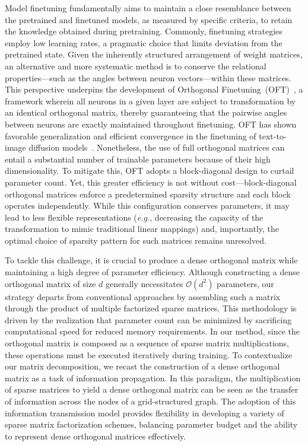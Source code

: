 Model finetuning fundamentally aims to maintain a close resemblance between the pretrained and finetuned models, as measured by specific criteria, to retain the knowledge obtained during pretraining. Commonly, finetuning strategies employ low learning rates, a pragmatic choice that limits deviation from the pretrained state. Given the inherently structured arrangement of weight matrices, an alternative and more systematic method is to conserve the relational properties—such as the angles between neuron vectors—within these matrices. This perspective underpins the development of Orthogonal Finetuning~(OFT)~\cite{qiu2023controlling}, a framework wherein all neurons in a given layer are subject to transformation by an identical orthogonal matrix, thereby guaranteeing that the pairwise angles between neurons are exactly maintained throughout finetuning. OFT has shown favorable generalization and efficient convergence in the finetuning of text-to-image diffusion models~\cite{qiu2023controlling}. Nonetheless, the use of full orthogonal matrices can entail a substantial number of trainable parameters because of their high dimensionality. To mitigate this, OFT adopts a block-diagonal design to curtail parameter count. Yet, this greater efficiency is not without cost—block-diagonal orthogonal matrices enforce a predetermined sparsity structure and each block operates independently. While this configuration conserves parameters, it may lead to less flexible representations (\emph{e.g.}, decreasing the capacity of the transformation to mimic traditional linear mappings) and, importantly, the optimal choice of sparsity pattern for such matrices remains unresolved.

To tackle this challenge, it is crucial to produce a dense orthogonal matrix while maintaining a high degree of parameter efficiency. Although constructing a dense orthogonal matrix of size $d$ generally necessitates $\mathcal{O}(d^2)$ parameters, our strategy departs from conventional approaches by assembling such a matrix through the product of multiple factorized sparse matrices. This methodology is driven by the realization that parameter count can be minimized by sacrificing computational speed for reduced memory requirements. In our method, since the orthogonal matrix is composed as a sequence of sparse matrix multiplications, these operations must be executed iteratively during training. To contextualize our matrix decomposition, we recast the construction of a dense orthogonal matrix as a task of information propagation. In this paradigm, the multiplication of sparse matrices to yield a dense orthogonal matrix can be seen as the transfer of information across the nodes of a grid-structured graph. The adoption of this information transmission model provides flexibility in developing a variety of sparse matrix factorization schemes, balancing parameter budget and the ability to represent dense orthogonal matrices effectively.

